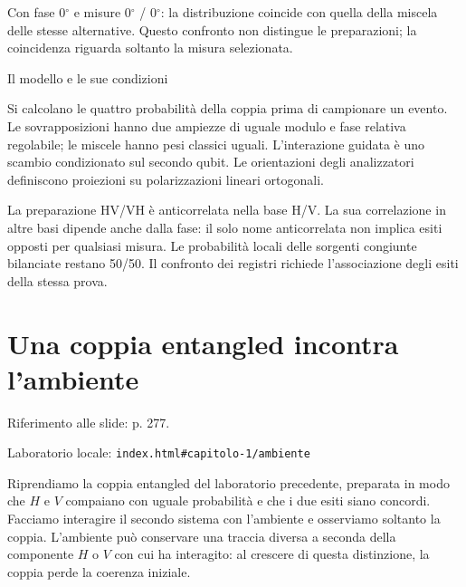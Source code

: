 Con fase \(0{}^{\circ} \) e misure \(0{}^{\circ} \) / \(0{}^{\circ} \): la distribuzione coincide con quella della miscela delle stesse alternative. Questo confronto non distingue le preparazioni; la coincidenza riguarda soltanto la misura selezionata.\par


Il modello e le sue condizioni\par

Si calcolano le quattro probabilità della coppia prima di campionare un evento. Le sovrapposizioni hanno due ampiezze di uguale modulo e fase relativa regolabile; le miscele hanno pesi classici uguali. L'interazione guidata è uno scambio condizionato sul secondo qubit. Le orientazioni degli analizzatori definiscono proiezioni su polarizzazioni lineari ortogonali.\par

La preparazione HV/VH è anticorrelata nella base H/V. La sua correlazione in altre basi dipende anche dalla fase: il solo nome \guillemotleft{}anticorrelata\guillemotright{} non implica esiti opposti per qualsiasi misura. Le probabilità locali delle sorgenti congiunte bilanciate restano 50/50. Il confronto dei registri richiede l'associazione degli esiti della stessa prova.\par



\Needspace{.43\textheight}
\section{Una coppia entangled incontra l'ambiente}
\label{c1-ambiente}

{\sffamily\small\color{Ink!70} Riferimento alle slide: p. 277.\par}

{\sffamily\small\color{Ink!70} Laboratorio locale: \nolinkurl{index.html#capitolo-1/ambiente}\par}

Riprendiamo la coppia entangled del laboratorio precedente, preparata in modo che \(H\) e \(V\) compaiano con uguale probabilità e che i due esiti siano concordi. Facciamo interagire il secondo sistema con l'ambiente e osserviamo soltanto la coppia. L'ambiente può conservare una traccia diversa a seconda della componente \(H\) o \(V\) con cui ha interagito: al crescere di questa distinzione, la coppia perde la coerenza iniziale.\par



